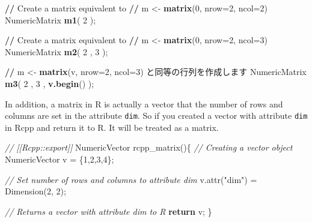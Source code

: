\documentclass[]{book}
\newenvironment{Shaded}{\begin{snugshade}}{\end{snugshade}}
\newcommand{\KeywordTok}[1]{\textcolor[rgb]{0.13,0.29,0.53}{\textbf{#1}}}
\newcommand{\DataTypeTok}[1]{\textcolor[rgb]{0.13,0.29,0.53}{#1}}
\newcommand{\DecValTok}[1]{\textcolor[rgb]{0.00,0.00,0.81}{#1}}
\newcommand{\StringTok}[1]{\textcolor[rgb]{0.31,0.60,0.02}{#1}}
\newcommand{\CommentTok}[1]{\textcolor[rgb]{0.56,0.35,0.01}{\textit{#1}}}
\newcommand{\ControlFlowTok}[1]{\textcolor[rgb]{0.13,0.29,0.53}{\textbf{#1}}}
\newcommand{\OperatorTok}[1]{\textcolor[rgb]{0.81,0.36,0.00}{\textbf{#1}}}
\newcommand{\ErrorTok}[1]{\textcolor[rgb]{0.64,0.00,0.00}{\textbf{#1}}}
\newcommand{\NormalTok}[1]{#1}
\theoremstyle{definition}
\theoremstyle{definition}
\theoremstyle{remark}
\begin{document}
\begin{Shaded}
\begin{Highlighting}[]
\OperatorTok{/}\ErrorTok{/}\StringTok{ }\NormalTok{Create a matrix equivalent to}
\OperatorTok{/}\ErrorTok{/}\StringTok{ }\NormalTok{m <-}\StringTok{ }\KeywordTok{matrix}\NormalTok{(}\DecValTok{0}\NormalTok{, }\DataTypeTok{nrow=}\DecValTok{2}\NormalTok{, }\DataTypeTok{ncol=}\DecValTok{2}\NormalTok{)}
\NormalTok{NumericMatrix }\KeywordTok{m1}\NormalTok{( }\DecValTok{2}\NormalTok{ );}

\OperatorTok{/}\ErrorTok{/}\StringTok{ }\NormalTok{Create a matrix equivalent to}
\OperatorTok{/}\ErrorTok{/}\StringTok{ }\NormalTok{m <-}\StringTok{ }\KeywordTok{matrix}\NormalTok{(}\DecValTok{0}\NormalTok{, }\DataTypeTok{nrow=}\DecValTok{2}\NormalTok{, }\DataTypeTok{ncol=}\DecValTok{3}\NormalTok{)}
\NormalTok{NumericMatrix }\KeywordTok{m2}\NormalTok{( }\DecValTok{2}\NormalTok{ , }\DecValTok{3}\NormalTok{ );}

\OperatorTok{/}\ErrorTok{/}\StringTok{ }\NormalTok{m <-}\StringTok{ }\KeywordTok{matrix}\NormalTok{(v, }\DataTypeTok{nrow=}\DecValTok{2}\NormalTok{, }\DataTypeTok{ncol=}\DecValTok{3}\NormalTok{) と同等の行列を作成します}
\NormalTok{NumericMatrix }\KeywordTok{m3}\NormalTok{( }\DecValTok{2}\NormalTok{ , }\DecValTok{3}\NormalTok{ , }\KeywordTok{v.begin}\NormalTok{() );}
\end{Highlighting}
\end{Shaded}

In addition, a matrix in R is actually a vector that the number of rows
and columns are set in the attribute \texttt{dim}. So if you created a
vector with attribute \texttt{dim} in Rcpp and return it to R. It will
be treated as a matrix.

\begin{Shaded}
\begin{Highlighting}[]
\CommentTok{// [[Rcpp::export]]}
\NormalTok{NumericVector rcpp_matrix()\{}
    \CommentTok{// Creating a vector object}
\NormalTok{    NumericVector v = \{}\DecValTok{1}\NormalTok{,}\DecValTok{2}\NormalTok{,}\DecValTok{3}\NormalTok{,}\DecValTok{4}\NormalTok{\};}

    \CommentTok{// Set number of rows and columns to attribute dim}
\NormalTok{    v.attr(}\StringTok{"dim"}\NormalTok{) = Dimension(}\DecValTok{2}\NormalTok{, }\DecValTok{2}\NormalTok{);}

    \CommentTok{// Returns a vector with attribute dim to R}
    \ControlFlowTok{return}\NormalTok{ v;}
\NormalTok{\}}
\end{Highlighting}
\end{Shaded}
\end{document}
